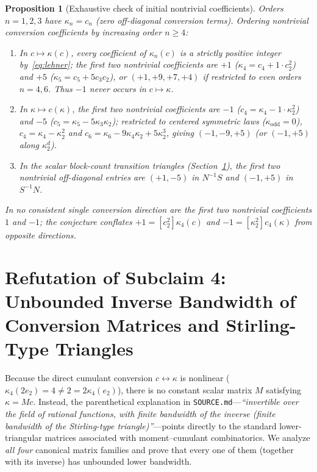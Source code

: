 \documentclass[11pt,a4paper]{article}
\newtheorem{proposition}[theorem]{Proposition}
\theoremstyle{definition}
\theoremstyle{remark}
\begin{document}
\begin{proposition}[Exhaustive check of initial nontrivial coefficients]\label{prop:coeffs}
Orders $n = 1,2,3$ have $\kappa_n = c_n$ (zero off-diagonal conversion terms). Ordering nontrivial conversion coefficients by increasing order $n \ge 4$:
\begin{enumerate}
  \item[(a)] In $c \mapsto \kappa(c)$, every coefficient of $\kappa_n(c)$ is a \emph{strictly positive} integer by~\eqref{eq:lehner}; the first two nontrivial coefficients are $+1$ ($\kappa_4 = c_4 + 1\cdot c_2^2$) and $+5$ ($\kappa_5 = c_5 + 5 c_3 c_2$), or $(+1,+9,+7,+4)$ if restricted to even orders $n = 4,6$. Thus $-1$ never occurs in $c \mapsto \kappa$.
  \item[(b)] In $\kappa \mapsto c(\kappa)$, the first two nontrivial coefficients are $-1$ ($c_4 = \kappa_4 - 1\cdot \kappa_2^2$) and $-5$ ($c_5 = \kappa_5 - 5 \kappa_3 \kappa_2$); restricted to centered symmetric laws ($\kappa_{\mathrm{odd}} = 0$), $c_4 = \kappa_4 - \kappa_2^2$ and $c_6 = \kappa_6 - 9\kappa_4\kappa_2 + 5\kappa_2^3$, giving $(-1,-9,+5)$ (or $(-1,+5)$ along $\kappa_2^d$).
  \item[(c)] In the scalar block-count transition triangles (Section~\ref{sec:bandwidth}), the first two nontrivial off-diagonal entries are $(+1,-5)$ in $N^{-1}S$ and $(-1,+5)$ in $S^{-1}N$.
\end{enumerate}
In no consistent single conversion direction are the first two nontrivial coefficients $1$ and $-1$; the conjecture conflates $+1 = [c_2^2]\kappa_4(c)$ and $-1 = [\kappa_2^2]c_4(\kappa)$ from opposite directions.
\end{proposition}

\section{Refutation of Subclaim 4: Unbounded Inverse Bandwidth of Conversion Matrices and Stirling-Type Triangles}\label{sec:bandwidth}

Because the direct cumulant conversion $c \leftrightarrow \kappa$ is nonlinear ($\kappa_4(2e_2) = 4 \ne 2 = 2\kappa_4(e_2)$), there is no constant scalar matrix $M$ satisfying $\kappa = M c$. Instead, the parenthetical explanation in \texttt{SOURCE.md}---\emph{``invertible over the field of rational functions, with finite bandwidth of the inverse (finite bandwidth of the Stirling-type triangle)''}---points directly to the standard lower-triangular matrices associated with moment--cumulant combinatorics. We analyze \emph{all four} canonical matrix families and prove that every one of them (together with its inverse) has unbounded lower bandwidth.
\end{document}
